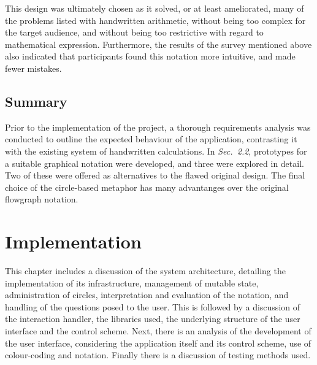 \documentclass[12pt,twoside,notitlepage,xetex]{report}
\begin{document}
{This design was ultimately chosen as it solved, or at least ameliorated, many of the problems listed with handwritten arithmetic, without being too complex for the target audience, and without being too restrictive with regard to mathematical expression.  Furthermore, the results of the survey mentioned above also indicated that participants found this notation more intuitive, and made fewer mistakes.




\section{Summary}

Prior to the implementation of the project, a thorough requirements analysis was conducted to outline the expected behaviour of the application, contrasting it with the existing system of handwritten calculations.  In \emph{Sec.~2.2}, prototypes for a suitable graphical notation were developed, and three were explored in detail.  Two of these were offered as alternatives to the flawed original design.  The final choice of the circle-based metaphor has many advantanges over the original flowgraph notation.

\cleardoublepage
\chapter{Implementation}

This chapter includes a discussion of the system architecture, detailing the implementation of its infrastructure, management of mutable state, administration of circles, interpretation and evaluation of the notation, and handling of the questions posed to the user.  This is followed by a discussion of the interaction handler, the libraries used, the underlying structure of the user interface and the control scheme.  Next, there is an analysis of the development of the user interface, considering the application itself and its control scheme, use of colour-coding and notation.  Finally there is a discussion of testing methods used.

}
\end{document}
